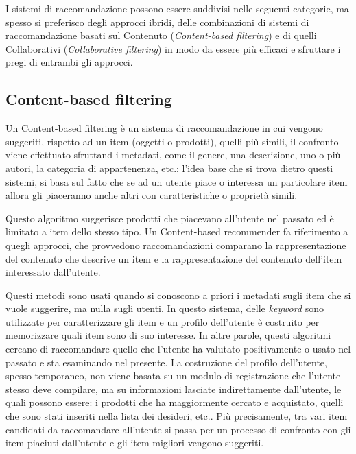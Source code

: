 I sistemi di raccomandazione possono essere suddivisi nelle seguenti categorie, ma spesso si preferisco degli approcci ibridi, delle
combinazioni di sistemi di raccomandazione basati sul Contenuto (\textit{Content-based filtering}) e di
quelli Collaborativi (\textit{Collaborative filtering}) in modo da essere più efficaci e sfruttare i pregi di entrambi gli approcci.


\subsection{Content-based filtering}
Un Content-based filtering è un sistema di raccomandazione in cui vengono suggeriti, rispetto ad un item (oggetti o prodotti), quelli 
più simili, il confronto viene effettuato sfruttand i metadati, come il genere, una descrizione, uno o più autori, la categoria di 
appartenenza, etc.; l'idea base che si trova dietro questi sistemi, si basa sul fatto che se ad un utente piace o interessa un particolare 
item allora gli piaceranno anche altri con caratteristiche o proprietà simili.

Questo algoritmo suggerisce prodotti che piacevano all'utente nel passato ed è limitato a item dello stesso tipo. Un 
Content-based recommender fa riferimento a quegli approcci, che provvedono raccomandazioni comparano la rappresentazione del
contenuto che descrive un item e la rappresentazione del contenuto dell'item interessato dall'utente. 

Questi metodi sono usati quando si conoscono a priori i metadati sugli item che si vuole suggerire, ma nulla sugli utenti.
In questo sistema, delle \textit{keyword} sono utilizzate per caratterizzare gli item e un profilo dell'utente è 
costruito per memorizzare quali item sono di suo interesse. In altre parole, questi algoritmi cercano di raccomandare quello che 
l'utente ha valutato positivamente o usato nel passato e sta esaminando nel presente. La costruzione del profilo dell'utente,
spesso temporaneo, non viene basata su un modulo di registrazione che l'utente stesso deve compilare, ma su informazioni
lasciate indirettamente dall'utente, le quali possono essere: i prodotti che ha maggiormente cercato e acquistato, quelli che sono 
stati inseriti nella lista dei desideri, etc.. Più precisamente, tra vari item candidati da raccomandare all'utente si passa per un 
processo di confronto con gli item piaciuti dall'utente e gli item migliori vengono suggeriti.


